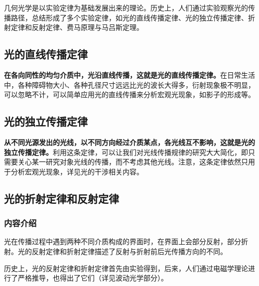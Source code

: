 

几何光学是以实验定律为基础发展出来的理论。历史上，人们通过实验观察光的传播路径，总结形成了多个实验定律，如光的直线传播定律、光的独立传播定律、折射定律和反射定律、费马原理与马吕斯定理。

\subsection{光的直线传播定律}

\textbf{在各向同性的均匀介质中，光沿直线传播，这就是光的直线传播定律。}在日常生活中，各种障碍物大小、各种孔径尺寸远远比光的波长大得多，衍射现象极不明显，可以忽略不计，可以简单应用光的直线传播来分析宏观光现象，如影子的形成等。

\subsection{光的独立传播定律}

\textbf{从不同光源发出的光线，以不同方向经过介质某点，各光线互不影响，这就是光的独立传播定律。}利用这条定律，可以让我们对光线传播规律的研究大大简化，即只需要关心某一研究对象光线的传播，而不考虑其他光线。注意，这条定律依然只用于分析宏观光现象，详见光的干涉相关内容。

\subsection{光的折射定律和反射定律}

\subsubsection{内容介绍}

光在传播过程中遇到两种不同介质构成的界面时，在界面上会部分反射，部分折射。光的反射定律和折射定律描述了反射与折射前后光传播方向的不同。

历史上，光的反射定律和折射定律首先由实验得到，后来，人们通过电磁学理论进行了严格推导，也得出了它们（详见波动光学部分）。


